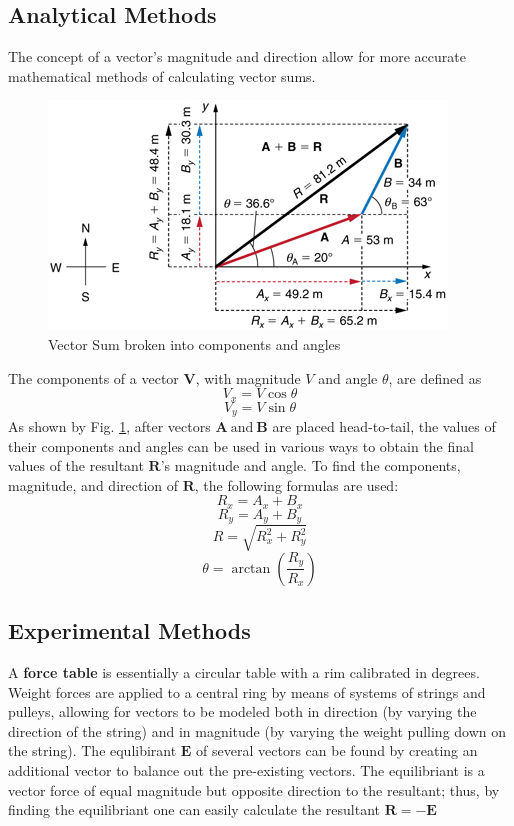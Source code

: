 \documentclass[11pt, titlepage]{article}
\begin{document}
\subsection*{Analytical Methods}
The concept of a vector's magnitude and direction allow for more accurate mathematical methods of calculating vector sums.
\begin{figure}[!ht]
\centering
\includegraphics[scale=1.5, angle=0]{lab03_analyticalvectors.jpg}
\caption{Vector Sum broken into components and angles \label{fig:2}}
\end{figure} 

\noindent The components of a vector $\mathbf{V}$, with magnitude $V$ and angle $\theta$, are defined as
$$ V_x = V \cos\theta$$
\begin{equation} \label{eq:1}
V_y = V \sin\theta
\end{equation}
As shown by Fig. \ref{fig:2}, after vectors $\mathbf{A} ~\text{and} ~\mathbf{B}$ are placed head-to-tail, the values of their components and angles can be used in various ways to obtain the final values of the resultant $\mathbf{R}$'s magnitude and angle. To find the components, magnitude, and direction of $\mathbf{R}$, the following formulas are used:
$$R_x = A_x + B_x$$
$$R_y = A_y + B_y$$
$$R = \sqrt{R_x^2 + R_y^2}$$
\begin{equation} \label{eq:2}
\theta = \arctan({\frac{R_y}{R_x}})
\end{equation}

\subsection*{Experimental Methods}
A \textbf{force table} is essentially a circular table with a rim calibrated in degrees. Weight forces are applied to a central ring by means of systems of strings and pulleys, allowing for vectors to be modeled  both in direction (by varying the direction of the string) and in magnitude (by varying the weight pulling down on the string). The equlibirant $\mathbf{E}$ of several vectors can be found by creating an additional vector to balance out the pre-existing vectors. The equilibriant is a vector force of equal magnitude but opposite direction to the resultant; thus, by finding the equilibriant one can easily calculate the resultant $\mathbf{R} = -\mathbf{E}$
\end{document}
